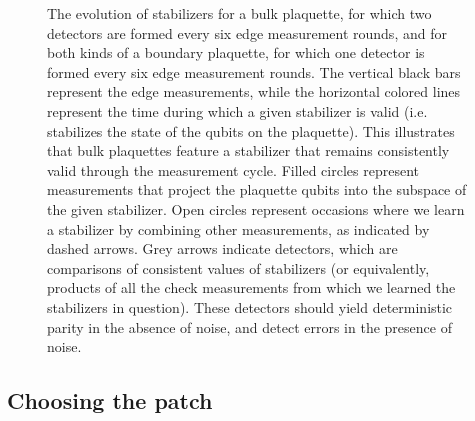 \documentclass[onecolumn,unpublished,a4paper]{quantumarticle}
\theoremstyle{definition}
\theoremstyle{definition}
\theoremstyle{definition}
\begin{document}
\begin{figure}[ht!]
    \centering
    \caption{
    The evolution of stabilizers for a bulk plaquette, for which two detectors are formed every six edge measurement rounds, and for both kinds of a boundary plaquette, for which one detector is formed every six edge measurement rounds.  The vertical black bars represent the edge measurements, while the horizontal colored lines represent the time during which a given stabilizer is valid (i.e. stabilizes the state of the qubits on the plaquette).  This illustrates that bulk plaquettes feature a stabilizer that remains consistently valid through the measurement cycle. Filled circles represent measurements that project the plaquette qubits into the subspace of the given stabilizer.  Open circles represent occasions where we learn a stabilizer by combining other measurements, as indicated by dashed arrows. Grey arrows indicate detectors, which are comparisons of consistent values of stabilizers (or equivalently, products of all the check measurements from which we learned the stabilizers in question). These detectors should yield deterministic parity in the absence of noise, and detect errors in the presence of noise.
    }
    \label{fig:detectors}
\end{figure}

\subsection{Choosing the patch}
\label{sec:patches}
\end{document}
